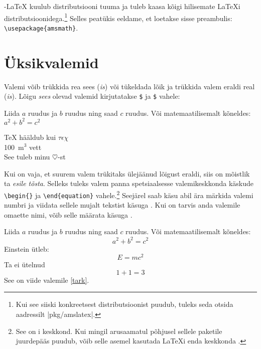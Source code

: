 \AmS-\LaTeX{} kuulub distributsiooni tuuma ja tuleb kaasa kõigi
hilisemate \LaTeX i distributsioonidega.\footnote{Kui see siiski
konkreetsest distributsioonist puudub, tuleks seda otsida aadressilt
\CTAN|pkg/amslatex|.} Selles peatükis eeldame, et  loetakse
sisse preambulis: \verb|\usepackage{amsmath}|.

\section{Üksikvalemid}

Valemi võib trükkida rea sees (\emph{is}) või
tükeldada lõik ja trükkida valem eraldi real
(\emph{is}). Lõigu \emph{sees} olevad valemid
kirjutatakse  %
\texttt{\$} ja \texttt{\$} vahele:

\begin{example}
Liida $a$ ruudus ja $b$ ruudus
ning saad $c$ ruudus. Või
matemaatilisemalt kõneldes:
$a^2 + b^2 = c^2$
\end{example}
\begin{example}
\TeX{} hääldub kui
$\tau\epsilon\chi$\\[5pt]
100~m$^{3}$ vett\\[5pt]
See tuleb minu $\heartsuit$-st
\end{example}

Kui on vaja, et suurem valem trükitaks ülejäänud lõigust eraldi, siis on
mõistlik ta \emph{esile tõsta}. Selleks tuleks valem panna
spetsiaalsesse valemikeskkonda käskude
\verb|\begin{|\verb|}| ja \verb|\end{equation}|
vahele.\footnote{See on i keskkond. Kui mingil arusaamatul
põhjusel sellele paketile juurdepääs puudub, võib selle asemel kasutada
\LaTeX i enda keskkonda .} Seejärel saab käsu 
abil ära märkida valemi numbri ja viidata sellele mujalt tekstist käsuga
. Kui on tarvis anda valemile omaette nimi, võib selle määrata
käsuga .
\begin{example}
Liida $a$ ruudus ja $b$ ruudus
ning saad $c$ ruudus. Või
matemaatilisemalt kõneldes:
 \begin{equation}
   a^2 + b^2 = c^2
 \end{equation}
Einstein ütleb:
 \begin{equation}
   E = mc^2 \label{tark}
 \end{equation}
Ta ei ütelnud
 \begin{equation}
  1 + 1 = 3 \tag{rumal}
 \end{equation}
See on viide valemile
\eqref{tark}.
\end{example}

